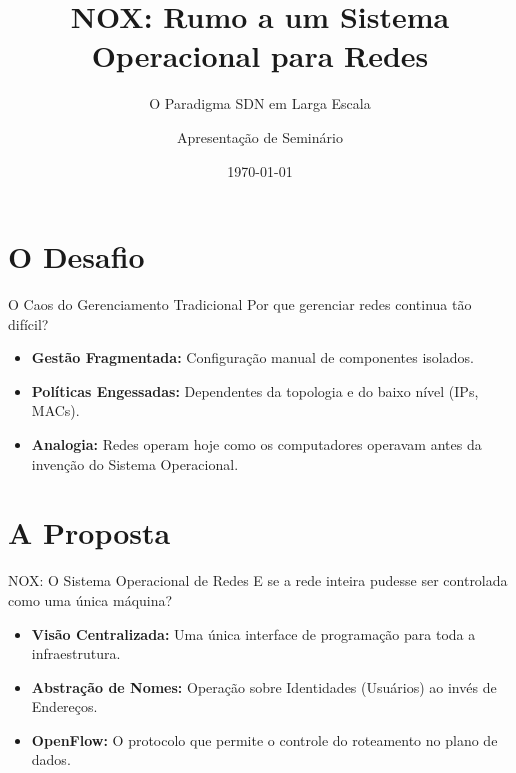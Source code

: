 \documentclass[aspectratio=169,xcolor=dvipsnames]{beamer}
\title{NOX: Rumo a um Sistema Operacional para Redes}
\subtitle{O Paradigma SDN em Larga Escala}
\author{Apresentação de Seminário}
\institute{Programa de Pós-Graduação}
\date{\today}
\begin{document}
\begin{frame}[plain]
    \titlepage
\end{frame}

\section{O Desafio}

\begin{frame}{O Caos do Gerenciamento Tradicional}
    Por que gerenciar redes continua tão difícil?
    
    \vspace{0.5cm}
    
    \begin{itemize}            
        \item \textbf{Gestão Fragmentada:} Configuração manual de componentes isolados.
        \item \textbf{Políticas Engessadas:} Dependentes da topologia e do baixo nível (IPs, MACs).
        \item \textbf{Analogia:} Redes operam hoje como os computadores operavam antes da invenção do Sistema Operacional.
    \end{itemize}
    
    \vspace{0.3cm}
\end{frame}

\section{A Proposta}

\begin{frame}{NOX: O Sistema Operacional de Redes}
    E se a rede inteira pudesse ser controlada como uma única máquina?
    
    \vspace{0.5cm}
    
    \begin{itemize}            
        \item \textbf{Visão Centralizada:} Uma única interface de programação para toda a infraestrutura.
        \item \textbf{Abstração de Nomes:} Operação sobre Identidades (Usuários) ao invés de Endereços.
        \item \textbf{OpenFlow:} O protocolo que permite o controle do roteamento no plano de dados.
    \end{itemize}
    
    \vspace{0.3cm}
\end{frame}
\end{document}
